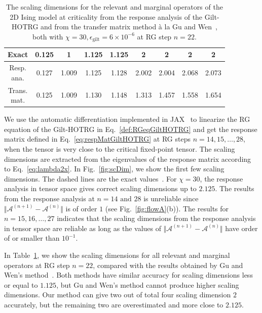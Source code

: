 \documentclass[aps,prb,reprint,superscriptaddress]{revtex4-2}
\begin{document}
%
\begin{table}[h]%
\caption{The scaling dimensions for the relevant and marginal operators
    of the 2D Ising model at criticality from the response analysis of
    the Gilt-HOTRG and from the transfer matrix method \`a la Gu and
    Wen~\cite{GuWen2009}, both with $\chi = 30, \epsilon_{\text{gilt}} =
    6\times 10^{-6}$ at RG step $n = 22$.\label{table:scDim}} 
\begin{ruledtabular}
\begin{tabular}{ c c c c c c c c c }
Exact      & 0.125 & 1 & 1.125 & 1.125 & 2 & 2 & 2 & 2 \\
\hline
\thead{Resp.\\ ana.} & 0.127 & 1.009 & 1.125 & 1.128 & 2.002 &
2.004 & 2.068 & 2.073 \\
\thead{Trans.\\ mat.} & 0.125 & 1.009 & 1.130 & 1.148 & 1.313 &
1.457 & 1.558 & 1.654
\end{tabular}
\end{ruledtabular}
\end{table}
%

We use the automatic differentiation implemented in
JAX~\cite{jax2018github} to linearize the RG equation of the Gilt-HOTRG in
Eq.~\eqref{def:RGeqGiltHOTRG} and get the response matrix defined in
Eq.~\eqref{eq:respMatGiltHOTRG} at RG steps $n = 14,15,\ldots, 28$, when the
tensor is very close to the critical fixed-point tensor. The scaling
dimensions are extracted from the eigenvalues of the response matrix
according to Eq.~\eqref{eq:lambda2x}. In Fig.~\ref{fig:scDim}, we show
the first few scaling dimensions. The dashed lines are the exact
values~\cite{DiFrancesco1997}. For $\chi = 30$, the response analysis in
tensor space gives correct scaling dimensions up to $2.125$. The results from
the response analysis at $n = 14 \text{ and } 28$ is unreliable since $\Vert
\mathcal{A}^{(n+1)} - \mathcal{A}^{(n)}\Vert$ is of order $1$ (see
Fig.~\ref{fig:flowA}(b)). The results for $n = 15,16,\ldots,27$
indicates that the scaling dimensions from the response analysis in tensor
space are reliable as long as the values of $\Vert \mathcal{A}^{(n+1)} -
\mathcal{A}^{(n)}\Vert$ have order of or smaller than $10^{-1}$. 
%

In Table~\ref{table:scDim}, we show the scaling dimensions for all
relevant and marginal operators at RG step $n = 22$, compared with
the results obtained by Gu and Wen's method~\cite{GuWen2009}. Both
methods have similar accuracy for scaling dimensions less or equal to
$1.125$, but Gu and Wen's method cannot produce higher scaling
dimensions. Our method can give two out of total four scaling dimension
$2$ accurately, but the remaining two are overestimated and more close
to $2.125$.
%
\end{document}

